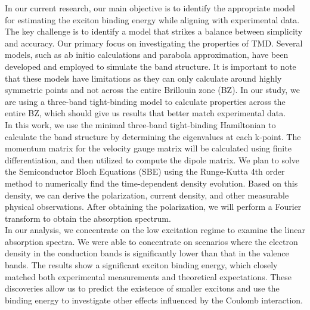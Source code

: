 \documentclass[12pt,english,a4paper]{article}
\begin{document}
	
	\quad In our current research, our main objective is to identify the appropriate model for estimating the exciton binding energy while aligning with experimental data. The key challenge is to identify a model that strikes a balance between simplicity and accuracy. Our primary focus on investigating the properties of TMD. Several models, such as ab initio calculations\cite{kirichenko_influence_2021,ramasubramaniam_large_2012,qiu_optical_2013,cheiwchanchamnangij_quasiparticle_2012,shi_quasiparticle_2013} and parabola approximation\cite{meckbach_ultrafast_2020,berkelbach_theory_2013}, have been developed and employed to simulate the band structure. It is important to note that these models have limitations as they can only calculate around highly symmetric points and not across the entire Brillouin zone (BZ). In our study, we are using a three-band tight-binding model to calculate properties across the entire BZ, which should give us results that better match experimental data.\\\null
	\quad In this work, we use the minimal three-band tight-binding Hamiltonian\cite{liu_three-band_2013} to calculate the band structure by determining the eigenvalues at each k-point. The momentum matrix for the velocity gauge matrix will be calculated using finite differentiation, and then utilized to compute the dipole matrix. We plan to solve the Semiconductor Bloch Equations (SBE) using the Runge-Kutta 4th order method to numerically find the time-dependent density evolution. Based on this density, we can derive the polarization, current density, and other measurable physical observations. After obtaining the polarization, we will perform a Fourier transform to obtain the absorption spectrum.\\\null	
	\quad In our analysis, we concentrate on the low excitation regime to examine the linear absorption spectra. We were able to concentrate on scenarios where the electron density in the conduction bands is significantly lower than that in the valence bands. The results show a significant exciton binding energy, which closely matched both experimental measurements and theoretical expectations. These discoveries allow us to predict the existence of smaller excitons and use the binding energy to investigate other effects influenced by the Coulomb interaction.\\
	
\end{document}

